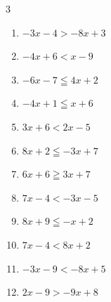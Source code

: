 


\setcounter{quesnum}{45}

\begin{multicols}{3}
\begin{enumerate}
  \itemsep=9pt
  \item $-3x-4>-8x+3$


  \item $-4x+6<x-9$

        \phantom{$\displaystyle x>3$}

  \item $-6x-7\leqq 4x+2$


  \item $-4x+1\leqq x+6$

        \phantom{$\displaystyle x\geqq -1$}

  \item $3x+6<2x-5$

        \phantom{$\displaystyle x<-11$}

  \item $8x+2\leqq -3x+7$


  \item $6x+6\geqq 3x+7$


  \item $7x-4<-3x-5$


  \item $8x+9\leqq -x+2$


  \item $7x-4<8x+2$

        \phantom{$\displaystyle x>-6$}

  \item $-3x-9<-8x+5$


  \item $2x-9>-9x+8$



\end{enumerate}
\end{multicols}
